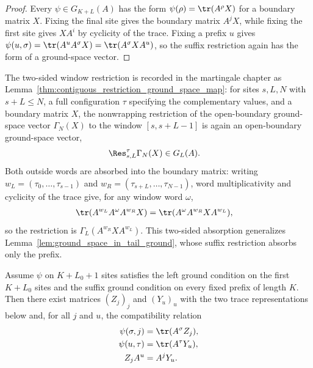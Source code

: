 \begin{proof}
    \leanok
    Every $\psi \in G_{K+L}(A)$ has the form $\psi(\rho) = \tr(A^\rho X)$ for a
    boundary matrix $X$. Fixing the final site gives the boundary matrix
    $A^jX$, while fixing the first site gives $XA^i$ by cyclicity of the trace.
    Fixing a prefix $u$ gives
    $\psi(u,\sigma)=\tr(A^uA^\sigma X)=\tr(A^\sigma XA^u)$, so the suffix
    restriction again has the form of a ground-space vector.
\end{proof}

\begin{remark}
    \label{rem:contiguous_restriction_ground_space_map_intersection}
    The two-sided window restriction is recorded in the martingale chapter as
    Lemma~\ref{thm:contiguous_restriction_ground_space_map}: for sites
    $s,L,N$ with $s+L \le N$, a full configuration $\tau$ specifying the
    complementary values, and a boundary matrix $X$, the nonwrapping
    restriction of the open-boundary ground-space vector $\Gamma_N(X)$ to the
    window $[s,s+L-1]$ is again an open-boundary ground-space vector,
    \begin{align}
        \Res^\tau_{s,L}\Gamma_N(X) & \in G_L(A).
        \notag
    \end{align}
    Both outside words are absorbed into the boundary matrix: writing
    $w_L=(\tau_0,\ldots,\tau_{s-1})$ and
    $w_R=(\tau_{s+L},\ldots,\tau_{N-1})$, word multiplicativity and
    cyclicity of the trace give, for any window word $\omega$,
    \begin{align}
        \tr(A^{w_L}A^\omega A^{w_R}X)
         & =\tr(A^\omega A^{w_R}XA^{w_L}),
        \notag
    \end{align}
    so the restriction is $\Gamma_L(A^{w_R}XA^{w_L})$. This two-sided
    absorption generalizes Lemma~\ref{lem:ground_space_in_tail_ground},
    whose suffix restriction absorbs only the prefix.
\end{remark}

\begin{lemma}\label{lem:left_tail_compatibility}
    \leanok
    Assume $\psi$ on $K+L_0+1$ sites satisfies the left ground condition on the
    first $K+L_0$ sites and the suffix ground condition on every fixed prefix of
    length $K$. Then there exist matrices $(Z_j)_j$ and $(Y_u)_u$ with the two
    trace representations below and, for all $j$ and $u$, the compatibility
    relation
    \begin{align}
        \psi(\sigma,j)
         & = \tr(A^\sigma Z_j),
        \notag                  \\
        \psi(u,\tau)
         & = \tr(A^\tau Y_u),
        \notag                  \\
        Z_jA^u
         & = A^jY_u.
        \notag
    \end{align}
\end{lemma}

